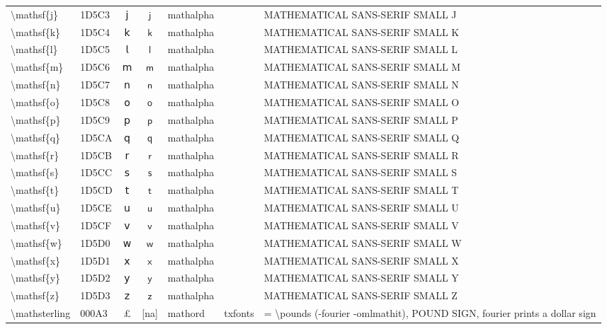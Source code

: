 \documentclass[a4paper,landscape]{article}
\begin{document}
\begin{longtable}{llcclll}
\textbackslash{}mathsf\{j\} & 1D5C3 & 𝗃 & $\mathsf{j}$ & mathalpha &  & MATHEMATICAL SANS-SERIF SMALL J \\
\textbackslash{}mathsf\{k\} & 1D5C4 & 𝗄 & $\mathsf{k}$ & mathalpha &  & MATHEMATICAL SANS-SERIF SMALL K \\
\textbackslash{}mathsf\{l\} & 1D5C5 & 𝗅 & $\mathsf{l}$ & mathalpha &  & MATHEMATICAL SANS-SERIF SMALL L \\
\textbackslash{}mathsf\{m\} & 1D5C6 & 𝗆 & $\mathsf{m}$ & mathalpha &  & MATHEMATICAL SANS-SERIF SMALL M \\
\textbackslash{}mathsf\{n\} & 1D5C7 & 𝗇 & $\mathsf{n}$ & mathalpha &  & MATHEMATICAL SANS-SERIF SMALL N \\
\textbackslash{}mathsf\{o\} & 1D5C8 & 𝗈 & $\mathsf{o}$ & mathalpha &  & MATHEMATICAL SANS-SERIF SMALL O \\
\textbackslash{}mathsf\{p\} & 1D5C9 & 𝗉 & $\mathsf{p}$ & mathalpha &  & MATHEMATICAL SANS-SERIF SMALL P \\
\textbackslash{}mathsf\{q\} & 1D5CA & 𝗊 & $\mathsf{q}$ & mathalpha &  & MATHEMATICAL SANS-SERIF SMALL Q \\
\textbackslash{}mathsf\{r\} & 1D5CB & 𝗋 & $\mathsf{r}$ & mathalpha &  & MATHEMATICAL SANS-SERIF SMALL R \\
\textbackslash{}mathsf\{s\} & 1D5CC & 𝗌 & $\mathsf{s}$ & mathalpha &  & MATHEMATICAL SANS-SERIF SMALL S \\
\textbackslash{}mathsf\{t\} & 1D5CD & 𝗍 & $\mathsf{t}$ & mathalpha &  & MATHEMATICAL SANS-SERIF SMALL T \\
\textbackslash{}mathsf\{u\} & 1D5CE & 𝗎 & $\mathsf{u}$ & mathalpha &  & MATHEMATICAL SANS-SERIF SMALL U \\
\textbackslash{}mathsf\{v\} & 1D5CF & 𝗏 & $\mathsf{v}$ & mathalpha &  & MATHEMATICAL SANS-SERIF SMALL V \\
\textbackslash{}mathsf\{w\} & 1D5D0 & 𝗐 & $\mathsf{w}$ & mathalpha &  & MATHEMATICAL SANS-SERIF SMALL W \\
\textbackslash{}mathsf\{x\} & 1D5D1 & 𝗑 & $\mathsf{x}$ & mathalpha &  & MATHEMATICAL SANS-SERIF SMALL X \\
\textbackslash{}mathsf\{y\} & 1D5D2 & 𝗒 & $\mathsf{y}$ & mathalpha &  & MATHEMATICAL SANS-SERIF SMALL Y \\
\textbackslash{}mathsf\{z\} & 1D5D3 & 𝗓 & $\mathsf{z}$ & mathalpha &  & MATHEMATICAL SANS-SERIF SMALL Z \\
\textbackslash{}mathsterling & 000A3 & £ & [na] & mathord & txfonts & = \textbackslash{}pounds (-fourier -omlmathit),  POUND SIGN,  fourier prints a dollar sign \\

\end{longtable}
\end{document}

